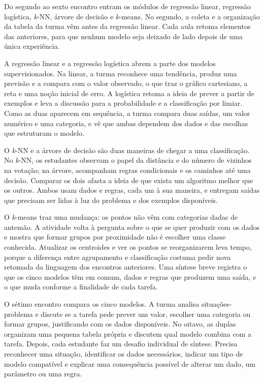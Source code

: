 Do segundo ao sexto encontro entram os módulos de regressão linear, regressão logística, \textit{k}-NN, árvore de decisão e \textit{k}-means. No segundo, a coleta e a organização da tabela da turma vêm antes da regressão linear. Cada aula retoma elementos das anteriores, para que nenhum modelo seja deixado de lado depois de uma única experiência.

A regressão linear e a regressão logística abrem a parte dos modelos supervisionados. Na linear, a turma reconhece uma tendência, produz uma previsão e a compara com o valor observado, o que traz o gráfico cartesiano, a reta e uma noção inicial de erro. A logística retoma a ideia de prever a partir de exemplos e leva a discussão para a probabilidade e a classificação por limiar. Como as duas aparecem em sequência, a turma compara duas saídas, um valor numérico e uma categoria, e vê que ambas dependem dos dados e das escolhas que estruturam o modelo.

O \textit{k}-NN e a árvore de decisão são duas maneiras de chegar a uma classificação. No \textit{k}-NN, os estudantes observam o papel da distância e do número de vizinhos na votação; na árvore, acompanham regras condicionais e os caminhos até uma decisão. Comparar os dois afasta a ideia de que exista um algoritmo melhor que os outros. Ambos usam dados e regras, cada um à sua maneira, e entregam saídas que precisam ser lidas à luz do problema e dos exemplos disponíveis.

O \textit{k}-means traz uma mudança: os pontos não vêm com categorias dadas de antemão. A atividade volta à pergunta sobre o que se quer produzir com os dados e mostra que formar grupos por proximidade não é escolher uma classe conhecida. Atualizar os centroides e ver os pontos se reorganizarem leva tempo, porque a diferença entre agrupamento e classificação costuma pedir nova retomada da linguagem dos encontros anteriores. Uma síntese breve registra o que os cinco modelos têm em comum, dados e regras que produzem uma saída, e o que muda conforme a finalidade de cada tarefa.

O sétimo encontro compara os cinco modelos. A turma analisa situações-problema e discute se a tarefa pede prever um valor, escolher uma categoria ou formar grupos, justificando com os dados disponíveis. No oitavo, as duplas organizam uma pequena tabela própria e discutem qual modelo combina com a tarefa. Depois, cada estudante faz um desafio individual de síntese. Precisa reconhecer uma situação, identificar os dados necessários, indicar um tipo de modelo compatível e explicar uma consequência possível de alterar um dado, um parâmetro ou uma regra.

